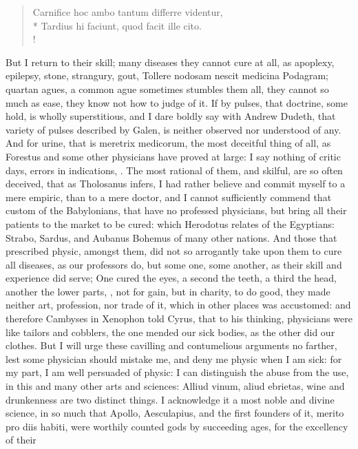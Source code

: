 {\begin{latin}
\begin{verse}
Carnifice hoc ambo tantum differre videntur,\\*
Tardius hi faciunt, quod facit ille cito.\\!
\end{verse}%
\end{latin}%
%
But I return to their skill; many diseases they cannot cure at all, as
apoplexy, epilepsy, stone, strangury, gout, Tollere nodosam nescit
medicina Podagram; quartan agues, a common ague sometimes
stumbles them all, they cannot so much as ease, they know not how to
judge of it. If by pulses, that doctrine, some hold, is wholly
superstitious, and I dare boldly say with Andrew Dudeth, that
variety of pulses described by Galen, is neither observed nor
understood of any. And for urine, that is meretrix medicorum, the most
deceitful thing of all, as Forestus and some other physicians have
proved at large: I say nothing of critic days, errors in indications,
\etc{}. The most rational of them, and skilful, are so often deceived, that
as Tholosanus infers, I had rather believe and commit myself to a
mere empiric, than to a mere doctor, and I cannot sufficiently commend
that custom of the Babylonians, that have no professed physicians, but
bring all their patients to the market to be cured: which Herodotus
relates of the Egyptians: Strabo, Sardus, and Aubanus Bohemus of many
other nations. And those that prescribed physic, amongst them, did not
so arrogantly take upon them to cure all diseases, as our professors
do, but some one, some another, as their skill and experience did
serve;  One cured the eyes, a second the teeth, a third the head,
another the lower parts, \etc{}, not for gain, but in charity, to do good,
they made neither art, profession, nor trade of it, which in other
places was accustomed: and therefore Cambyses in Xenophon told
Cyrus, that to his thinking, physicians were like tailors and cobblers,
the one mended our sick bodies, as the other did our clothes. But I
will urge these cavilling and contumelious arguments no farther, lest
some physician should mistake me, and deny me physic when I am sick:
for my part, I am well persuaded of physic: I can distinguish the abuse
from the use, in this and many other arts and sciences: Alliud
vinum, aliud ebrietas, wine and drunkenness are two distinct things. I
acknowledge it a most noble and divine science, in so much that Apollo,
Aesculapius, and the first founders of it, merito pro diis habiti, were
worthily counted gods by succeeding ages, for the excellency of their
}

